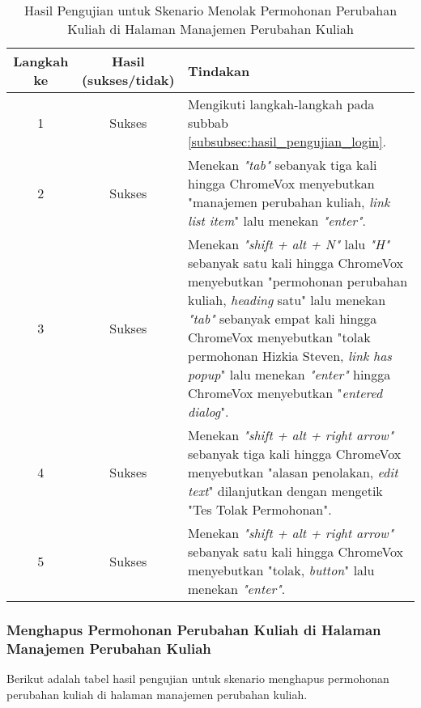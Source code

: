 \begin{table}[H]
    \centering 
    \caption{Hasil Pengujian untuk Skenario Menolak Permohonan Perubahan Kuliah di Halaman Manajemen Perubahan Kuliah}
    \label{tab:hasil_pengujian_menolak_permohonan_perubahan_kuliah_di_halaman_manajemen_perubahan_kuliah}
    \begin{tabular}{|c|c|p{10cm}|}
        \toprule
        Langkah ke & Hasil (sukses/tidak) & Tindakan \\

        \midrule
        1 & Sukses & Mengikuti langkah-langkah pada subbab \ref{subsubsec:hasil_pengujian_login}. \\
        2 & Sukses & Menekan \textit{"tab"} sebanyak tiga kali hingga ChromeVox menyebutkan "manajemen perubahan kuliah, \textit{link list item}" lalu menekan \textit{"enter"}. \\
        3 & Sukses & Menekan \textit{"shift + alt + N"} lalu \textit{"H"} sebanyak satu kali hingga ChromeVox menyebutkan "permohonan perubahan kuliah, \textit{heading} satu" lalu menekan \textit{"tab"} sebanyak empat kali hingga ChromeVox menyebutkan "tolak permohonan Hizkia Steven, \textit{link has popup}" lalu menekan \textit{"enter"} hingga ChromeVox menyebutkan "\textit{entered dialog}". \\
        4 & Sukses & Menekan \textit{"shift + alt + right arrow"} sebanyak tiga kali hingga ChromeVox menyebutkan "alasan penolakan, \textit{edit text}" dilanjutkan dengan mengetik "Tes Tolak Permohonan". \\
        5 & Sukses & Menekan \textit{"shift + alt + right arrow"} sebanyak satu kali hingga ChromeVox menyebutkan "tolak, \textit{button}" lalu menekan \textit{"enter"}. \\ 

        \bottomrule

    \end{tabular}
\end{table}

\subsubsection{Menghapus Permohonan Perubahan Kuliah di Halaman Manajemen Perubahan Kuliah}
\label{subsubsec:hasil_pengujian_menghapus_permohonan_perubahan_kuliah_di_halaman_manajemen_perubahan_kuliah}
Berikut adalah tabel hasil pengujian untuk skenario menghapus permohonan perubahan kuliah di halaman manajemen perubahan kuliah.

